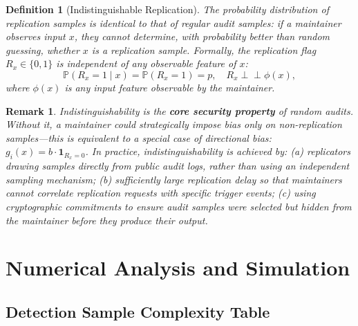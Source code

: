 \documentclass[11pt,a4paper]{article}
\newtheorem{definition}[theorem]{Definition}
\newtheorem{remark}[theorem]{Remark}
\theoremstyle{definition}
\newcommand{\Prob}{\mathbb{P}}
\newcommand{\indep}{\perp\!\!\!\perp}
\newcommand{\ind}[1]{\mathbf{1}_{#1}}
\begin{document}
\begin{definition}[Indistinguishable Replication]
\label{def:indist_replication}
The probability distribution of replication samples is identical to that of regular audit samples: if a maintainer observes input $x$, they cannot determine, with probability better than random guessing, whether $x$ is a replication sample. Formally, the replication flag $R_x \in \{0, 1\}$ is independent of any observable feature of $x$:
\begin{equation}\label{eq:indist}
    \Prob(R_x = 1 \mid x) = \Prob(R_x = 1) = p, \quad R_x \indep \phi(x),
\end{equation}
where $\phi(x)$ is any input feature observable by the maintainer.
\end{definition}

\begin{remark}
Indistinguishability is the \textbf{core security property} of random audits. Without it, a maintainer could strategically impose bias only on non-replication samples---this is equivalent to a special case of directional bias: $g_i(x) = b \cdot \ind{R_x = 0}$. In practice, indistinguishability is achieved by: (a) replicators drawing samples directly from public audit logs, rather than using an independent sampling mechanism; (b) sufficiently large replication delay so that maintainers cannot correlate replication requests with specific trigger events; (c) using cryptographic commitments to ensure audit samples were selected but hidden from the maintainer before they produce their output.
\end{remark}

\section{Numerical Analysis and Simulation}

\subsection{Detection Sample Complexity Table}
\end{document}
